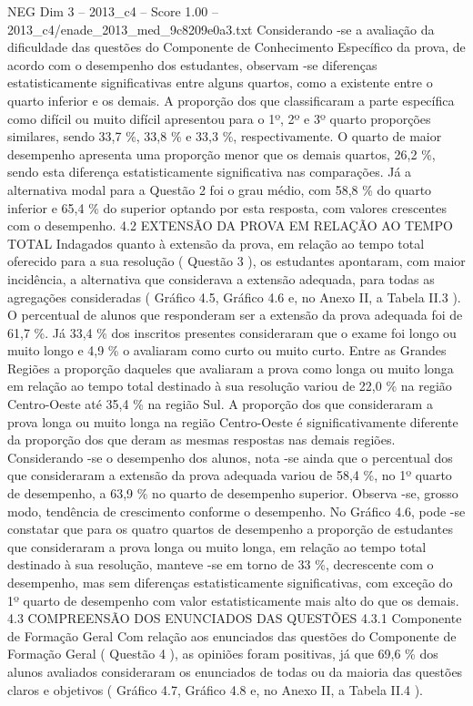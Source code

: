 \begin{textsample}{NEG Dim 3 – 2013\_c4 – Score 1.00 – 2013\_c4/enade\_2013\_med\_9c8209e0a3.txt}
Considerando -se a avaliação da dificuldade das questões do Componente de Conhecimento Específico da prova, de acordo com o desempenho dos estudantes, observam -se diferenças estatisticamente significativas entre alguns quartos, como a existente entre o quarto inferior e os demais.
A proporção dos que classificaram a parte específica como difícil ou muito difícil apresentou para o 1º, 2º e 3º quarto proporções similares, sendo 33,7 \%, 33,8 \% e 33,3 \%, respectivamente.
O quarto de maior desempenho apresenta uma proporção menor que os demais quartos, 26,2 \%, sendo esta diferença estatisticamente significativa nas comparações.
Já a alternativa modal para a Questão 2 foi o grau médio, com 58,8 \% do quarto inferior e 65,4 \% do superior optando por esta resposta, com valores crescentes com o desempenho. 4.2 EXTENSÃO DA PROVA EM RELAÇÃO AO TEMPO TOTAL Indagados quanto à extensão da prova, em relação ao tempo total oferecido para a sua resolução ( Questão 3 ), os estudantes apontaram, com maior incidência, a alternativa que considerava a extensão adequada, para todas as agregações consideradas ( Gráfico 4.5, Gráfico 4.6 e, no Anexo II, a Tabela II.3 ).
O percentual de alunos que responderam ser a extensão da prova adequada foi de 61,7 \%.
Já 33,4 \% dos inscritos presentes consideraram que o exame foi longo ou muito longo e 4,9 \% o avaliaram como curto ou muito curto.
Entre as Grandes Regiões a proporção daqueles que avaliaram a prova como longa ou muito longa em relação ao tempo total destinado à sua resolução variou de 22,0 \% na região Centro-Oeste até 35,4 \% na região Sul.
A proporção dos que consideraram a prova longa ou muito longa na região Centro-Oeste é significativamente diferente da proporção dos que deram as mesmas respostas nas demais regiões.
Considerando -se o desempenho dos alunos, nota -se ainda que o percentual dos que consideraram a extensão da prova adequada variou de 58,4 \%, no 1º quarto de desempenho, a 63,9 \% no quarto de desempenho superior.
Observa -se, grosso modo, tendência de crescimento conforme o desempenho.
No Gráfico 4.6, pode -se constatar que para os quatro quartos de desempenho a proporção de estudantes que consideraram a prova longa ou muito longa, em relação ao tempo total destinado à sua resolução, manteve -se em torno de 33 \%, decrescente com o desempenho, mas sem diferenças estatisticamente significativas, com exceção do 1º quarto de desempenho com valor estatisticamente mais alto do que os demais. 4.3 COMPREENSÃO DOS ENUNCIADOS DAS QUESTÕES 4.3.1 Componente de Formação Geral Com relação aos enunciados das questões do Componente de Formação Geral ( Questão 4 ), as opiniões foram positivas, já que 69,6 \% dos alunos avaliados consideraram os enunciados de todas ou da maioria das questões claros e objetivos ( Gráfico 4.7, Gráfico 4.8 e, no Anexo II, a Tabela II.4 ).

\end{textsample}
